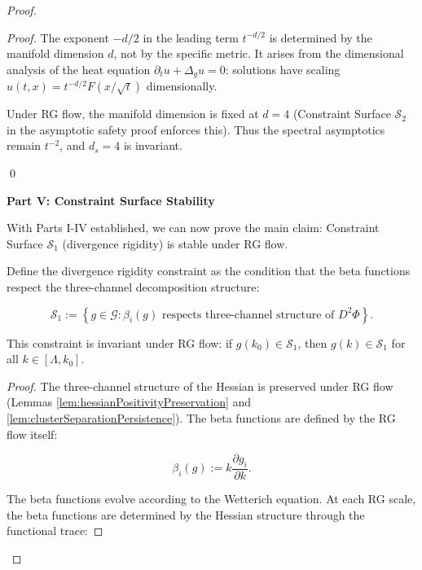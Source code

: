 \begin{proof}
\begin{lemma}
\begin{proof}
The exponent $-d/2$ in the leading term $t^{-d/2}$ is determined by the manifold dimension $d$, not by the specific metric. It arises from the dimensional analysis of the heat equation $\partial_t u + \Delta_g u = 0$: solutions have scaling $u(t, x) = t^{-d/2} F(x/\sqrt{t})$ dimensionally.

Under RG flow, the manifold dimension is fixed at $d = 4$ (Constraint Surface $\mathcal{S}_2$ in the asymptotic safety proof enforces this). Thus the spectral asymptotics remain $t^{-2}$, and $d_s = 4$ is invariant.

\qed

\end{proof}

\end{lemma}

\noindent\textbf{Part V: Constraint Surface Stability}

With Parts I-IV established, we can now prove the main claim: Constraint Surface $\mathcal{S}_1$ (divergence rigidity) is stable under RG flow.

\begin{lemma}
\label{lem:constraintS1Stability}

Define the divergence rigidity constraint as the condition that the beta functions respect the three-channel decomposition structure:

\begin{equation}
\mathcal{S}_1 := \left\{ g \in \mathcal{G} : \beta_i(g) \text{ respects three-channel structure of } D^2\Phi \right\}.
\end{equation}

This constraint is invariant under RG flow: if $g(k_0) \in \mathcal{S}_1$, then $g(k) \in \mathcal{S}_1$ for all $k \in [\Lambda, k_0]$.

\begin{proof}

The three-channel structure of the Hessian is preserved under RG flow (Lemmas \ref{lem:hessianPositivityPreservation} and \ref{lem:clusterSeparationPersistence}). The beta functions are defined by the RG flow itself:

\begin{equation}
\beta_i(g) := k \frac{\partial g_i}{\partial k}.
\end{equation}

The beta functions evolve according to the Wetterich equation. At each RG scale, the beta functions are determined by the Hessian structure through the functional trace:


\end{proof}
\end{lemma}
\end{proof}
